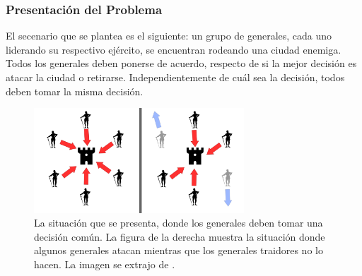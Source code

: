 \subsubsection{Presentación del Problema}

El secenario que se plantea es el siguiente: un grupo de generales, cada uno liderando su respectivo ejército, se encuentran rodeando una ciudad enemiga. Todos los generales deben ponerse de acuerdo, respecto de si la mejor decisión es atacar la ciudad o retirarse. Independientemente de cuál sea la decisión, todos deben tomar la misma decisión. 


\begin{figure}[H]
    \centering
    \includegraphics[width=0.7\textwidth]{img/Byzantine_Generals_Problem.png}
    \caption{La situación que se presenta, donde los generales deben tomar una decisión común. La figura de la derecha muestra la situación donde algunos generales atacan mientras que los generales traidores no lo hacen. La imagen se extrajo de \cite{wikipedia-contributors-2023}.}
    \label{fig:Byzantine_Generales_Problem}    
\end{figure}


